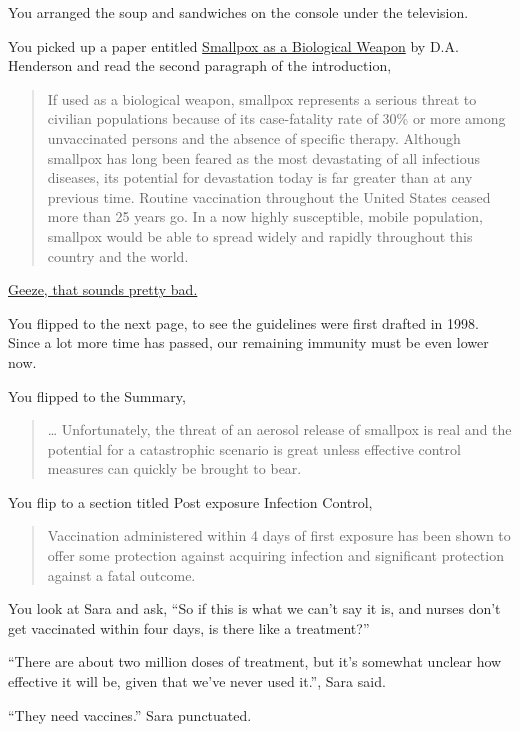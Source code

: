 \documentclass[17pt, twoside, a5paper, openright, extrafontsizes]{memoir}
\renewcommand{\emph}[1]{\ul{#1}}
\begin{document}
You arranged the soup and sandwiches on the console under the
television.

You picked up a paper entitled \emph{Smallpox as a Biological Weapon} by
D.A. Henderson and read the second paragraph of the introduction,

\begin{quote}
If used as a biological weapon, smallpox represents a serious threat to
civilian populations because of its case-fatality rate of 30\% or more
among unvaccinated persons and the absence of specific therapy. Although
smallpox has long been feared as the most devastating of all infectious
diseases, its potential for devastation today is far greater than at any
previous time. Routine vaccination throughout the United States ceased
more than 25 years go. In a now highly susceptible, mobile population,
smallpox would be able to spread widely and rapidly throughout this
country and the world.
\end{quote}

\emph{Geeze, that sounds pretty bad.}

You flipped to the next page, to see the guidelines were first drafted
in 1998. Since a lot more time has passed, our remaining immunity must
be even lower now.

You flipped to the Summary,

\begin{quote}
\ldots{} Unfortunately, the threat of an aerosol release of smallpox is
real and the potential for a catastrophic scenario is great unless
effective control measures can quickly be brought to bear.
\end{quote}

You flip to a section titled Post exposure Infection Control,

\begin{quote}
Vaccination administered within 4 days of first exposure has been shown
to offer some protection against acquiring infection and significant
protection against a fatal outcome.
\end{quote}

You look at Sara and ask, ``So if this is what we can't say it is, and
nurses don't get vaccinated within four days, is there like a
treatment?''

``There are about two million doses of treatment, but it's somewhat
unclear how effective it will be, given that we've never used it.'',
Sara said.

``They need vaccines.'' Sara punctuated.
\end{document}
